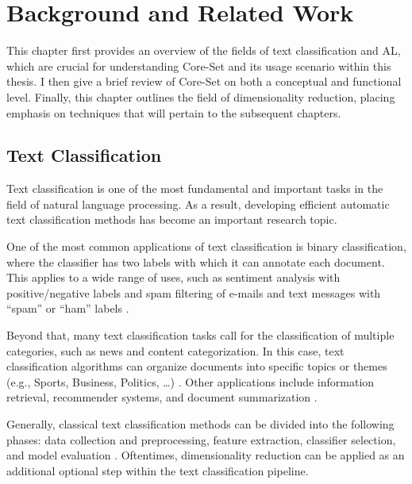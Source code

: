 \documentclass[english,bachelor,ul]{webisthesis} %
\begin{document}
\chapter{Background and Related Work}

This chapter first provides an overview of the fields of text classification and AL, which are crucial for understanding Core-Set and its usage scenario within this thesis. I then give a brief review of Core-Set on both a conceptual and functional level. Finally, this chapter outlines the field of dimensionality reduction, placing emphasis on techniques that will pertain to the subsequent chapters.

\section{Text Classification}

Text classification is one of the most fundamental and important tasks in the field of natural language processing. As a result, developing efficient automatic text classification methods has become an important research topic. 

One of the most common applications of text classification is binary classification, where the classifier has two labels with which it can annotate each document. This applies to a wide range of uses, such as sentiment analysis with positive/negative labels \citep{DBLP:books/sp/mining2012/LiuZ12} and spam filtering of e-mails and text messages with ``spam'' or ``ham'' labels \citep{10.1145/2034691.2034742}. 

Beyond that, many text classification tasks call for the classification of multiple categories, such as news and content categorization. In this case, text classification algorithms can organize documents into specific topics or themes (e.g., Sports, Business, Politics, \dots) \citep{DBLP:journals/csur/Sebastiani02}. Other applications include information retrieval, recommender systems, and document summarization \citep{DBLP:journals/information/KowsariMHMBB19}.

Generally, classical text classification methods can be divided into the following phases: data collection and preprocessing, feature extraction, classifier selection, and model evaluation \citep{DBLP:journals/information/KowsariMHMBB19, DBLP:journals/eswa/MironczukP18, ikonomakis2005text}. Oftentimes, dimensionality reduction can be applied as an additional optional step within the text classification pipeline.
\end{document}
